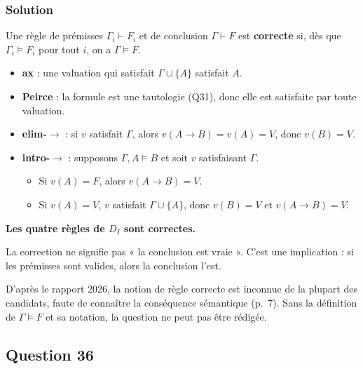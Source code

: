 \documentclass[11pt,a4paper]{article}
\providecommand{\tightlist}{\setlength{\itemsep}{0pt}\setlength{\parskip}{0pt}}
\begin{document}
\hypertarget{solution-34}{%
\subsubsection{Solution}\label{solution-34}}

Une règle de prémisses \(\Gamma_i \vdash F_i\) et de conclusion \(\Gamma \vdash F\) est \textbf{correcte} si, dès que \(\Gamma_i \models F_i\) pour tout \(i\), on a \(\Gamma \models F\).

\begin{itemize}
\tightlist
\item
  \textbf{ax} : une valuation qui satisfait \(\Gamma \cup \{A\}\) satisfait \(A\).
\item
  \textbf{Peirce} : la formule est une tautologie (Q31), donc elle est satisfaite par toute valuation.
\item
  \textbf{elim-\(\to\)} : si \(v\) satisfait \(\Gamma\), alors \(v(A \to B) = v(A) = V\), donc \(v(B) = V\).
\item
  \textbf{intro-\(\to\)} : supposons \(\Gamma, A \models B\) et soit \(v\) satisfaisant \(\Gamma\).

  \begin{itemize}
  \tightlist
  \item
    Si \(v(A) = F\), alors \(v(A \to B) = V\).
  \item
    Si \(v(A) = V\), \(v\) satisfait \(\Gamma \cup \{A\}\), donc \(v(B) = V\) et \(v(A \to B) = V\).
  \end{itemize}
\end{itemize}

\textbf{Les quatre règles de \(D_I\) sont correctes.}

\begin{piege}

La correction ne signifie pas « la conclusion est vraie ». C'est une implication : si les prémisses sont valides, alors la conclusion l'est.

\end{piege}

\begin{jury}

D'après le rapport 2026, la notion de règle correcte est inconnue de la plupart des candidats, faute de connaître la conséquence sémantique (p.~7). Sans la définition de \(\Gamma \models F\) et sa notation, la question ne peut pas être rédigée.

\end{jury}

\hypertarget{question-36}{%
\subsection{Question 36}\label{question-36}}
\end{document}
